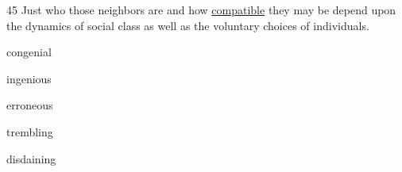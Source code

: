 \begin{question}{45}
Just who those neighbors are and how \uline{compatible} they may be depend upon the dynamics of social class as well as the voluntary choices of individuals. %
\begin{choices}
  \item congenial
  \item ingenious
  \item erroneous
  \item trembling
  \item disdaining
\end{choices}
\end{question}
